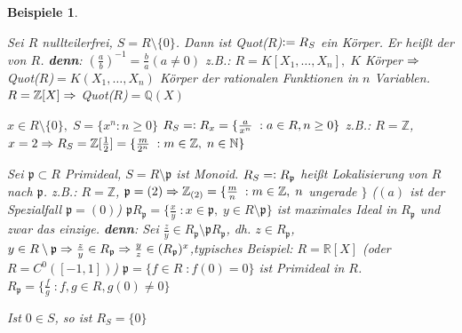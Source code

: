 \documentclass[a4paper,10pt,german]{scrbook}
\theoremstyle{saetze}
\theoremstyle{definitionen}
\newtheorem{Bsp}[Def]{Beispiele}
\begin{document}
\begin{Bsp}
\begin{enum}
\item Sei $R$ nullteilerfrei, $S = R \setminus \{0\}$. Dann ist
Quot($R$)$\mathrel{\mathop:}= R_S$ ein Körper.
\newline Er heißt der  von $R$.
\newline \textbf{denn}: $(\frac{a}{b})^{-1} = \frac{b}{a} (a \neq
0)$
\newline z.B.: $R = K[X_1,\dots,X_n],\; K$ Körper $\Rightarrow$ Quot($R$)$=
K(X_1,\dots,X_n)$ Körper der rationalen Funktionen in $n$ Variablen.
\newline $R = \mathbb{Z}[X] \Rightarrow$ Quot($R$)$ = \mathbb{Q}(X)$
\item $x \in R\setminus\{0\},\; S=\{x^n : n \geq 0\}$ $R_S =\mathrel{\mathop:}
R_x = \{ \frac{a}{x^n}\;:a\in R, n \geq 0\}$
\newline z.B.: $R = \mathbb{Z}$, $x=2 \Rightarrow R_S =
\mathbb{Z}[\frac{1}{2}] = \{ \frac{m}{2^n}\;: m \in \mathbb{Z},\;
n\in\mathbb{N}\}$
\item Sei $\mathfrak{p} \subset R$ Primideal, $S = R \setminus
\mathfrak{p}$ ist Monoid.
\newline $R_S =\mathrel{\mathop:} R_\mathfrak{p}$ heißt Lokalisierung von $R$
nach $\mathfrak{p}$.
\newline z.B.: $R = \mathbb{Z}$, $\mathfrak{p} = (2) \Rightarrow
\mathbb{Z}_{(2)} = \{\frac{m}{n}\;:m\in \mathbb{Z},\; n$ ungerade
$\}$ ($(a)$ ist der Spezialfall $\mathfrak{p} = (0)$)
\newline $\mathfrak{p}R_\mathfrak{p} = \{\frac{x}{y}\;:x\in
\mathfrak{p},\; y\in R \setminus \mathfrak{p}\}$ ist maximales Ideal
in $R_\mathfrak{p}$ und zwar das einzige.
\newline \textbf{denn}: Sei $\frac{z}{y} \in R_\mathfrak{p}
\setminus \mathfrak{p}R_\mathfrak{p}$, dh. $z \in R_\mathfrak{p}$,
$y \in R \setminus \mathfrak{p} \Rightarrow \frac{z}{y} \in R_\mathfrak{p}
\Rightarrow \frac{y}{z} \in (R_\mathfrak{p})^x$,\newline typisches Beispiel:
$R = \mathbb{R}[X]$ (oder $R = C^0([-1,1])$) $\mathfrak{p} = \{f \in
R\;: f(0) = 0\}$ ist Primideal in $R$. $R_\mathfrak{p} =
\{\frac{f}{g}\;: f,g \in R, g(0) \neq 0\}$

\item Ist $0 \in S$, so ist $R_S = \{0\}$
\end{enum}
\end{Bsp}
\end{document}
